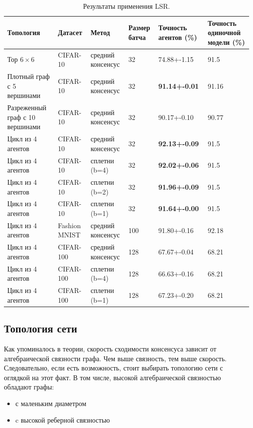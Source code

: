 \documentclass[a4paper,article,14pt]{extarticle}
\begin{document}
\begin{center}
    \begin{longtable}{|p{3cm}|p{2cm}|p{2.2cm}|p{1.8cm}|p{2cm}|p{2.7cm}|}
    \caption{Результаты применения LSR.}
    \label{table:lsr}\\
    \hline
    \textbf{Топология} & \textbf{Датасет} & \textbf{Метод} & \textbf{Размер батча} & \textbf{Точность агентов (\%)} & \textbf{Точность одиночной модели (\%)} \\
    \hline
    Тор $6\times 6$  & CIFAR-10 & средний консенсус& 32 & 74.88+-1.15 & 91.5\\
    \hline
    Плотный граф с 5 вершинами& CIFAR-10 & средний консенсус& 32 & \textbf{91.14+-0.01} & 91.16\\
    \hline
    Разреженный граф с 10 вершинами& CIFAR-10 & средний консенсус& 32 & 90.17+-0.10 & 90.77\\
    \hline
    Цикл из 4 агентов& CIFAR-10 & средний консенсус& 32 & \textbf{92.13+-0.09} & 91.5\\
    \hline
    Цикл из 4 агентов& CIFAR-10 & сплетни (b=4)& 32 & \textbf{92.02+-0.06} & 91.5\\
    \hline
    Цикл из 4 агентов& CIFAR-10 & сплетни (b=2)& 32 & \textbf{91.96+-0.09} & 91.5\\
    \hline
    Цикл из 4 агентов& CIFAR-10 & сплетни (b=1)& 32 & \textbf{91.64+-0.00} & 91.5\\
    \hline
    Цикл из 4 агентов& Fashion MNIST & средний консенсус & 100 & 91.80+-0.16 & 92.18\\
    \hline
    Цикл из 4 агентов& CIFAR-100  & средний консенсус& 128 & 67.67+-0.04 & 68.21\\
    \hline
    Цикл из 4 агентов& CIFAR-100  & сплетни (b=4)& 128 & 66.63+-0.16 & 68.21\\
    \hline
    Цикл из 4 агентов& CIFAR-100  & сплетни (b=1)& 128 & 67.23+-0.20 & 68.21\\
    \hline
    \end{longtable}
\end{center}

\subsection{Топология сети}
\label{section:topology}
Как упоминалось в теории, скорость сходимости консенсуса зависит от алгебраической связности графа. Чем выше связность, тем выше скорость. Следовательно, если есть возможность, стоит выбирать топологию сети с оглядкой на этот факт. В том числе, высокой алгебраической связностью обладают графы:
\begin{itemize}
    \item с маленьким диаметром
    \item c высокой реберной связностью
\end{itemize}
\end{document}
